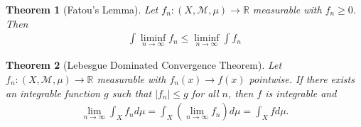 \documentclass[10pt]{article}         %
\newtheorem{theorem}{Theorem}[section]
\theoremstyle{remark}
\newcommand{\R}{\mathbb{R}}
\begin{document}
\begin{theorem}[Fatou's Lemma]
Let $f_n: (X,\mathcal{M},\mu) \rightarrow \R$ measurable with $f_n \geq 0$. Then
\begin{align*}
\int \liminf_{n\rightarrow \infty} f_n \leq \liminf_{n\rightarrow \infty} \int f_n
\end{align*}
\end{theorem}

\begin{theorem}[Lebesgue Dominated Convergence Theorem]
Let $f_n: (X,\mathcal{M},\mu) \rightarrow \R$ measurable with $f_n(x) \rightarrow f(x)$ pointwise. If there exists an integrable function $g$ such that $|f_n| \leq g$ for all $n$, then $f$ is integrable and
\begin{align*}
\lim_{n\rightarrow \infty} \int_X f_n d\mu = \int_X \left(\lim_{n\rightarrow \infty} f_n\right) d\mu = \int_X f d\mu.
\end{align*}
\end{theorem}
\end{document}
